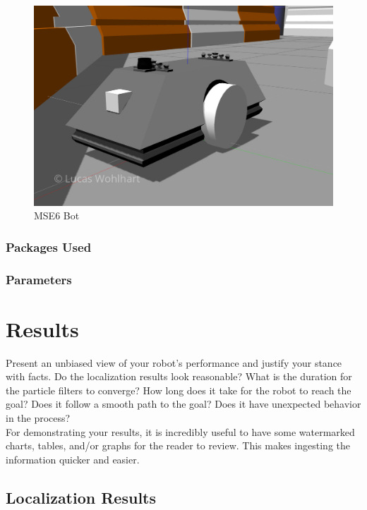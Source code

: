 \documentclass[10pt,journal,compsoc]{IEEEtran}
\begin{document}
\begin{figure}[thpb]
      \centering
      \includegraphics[width=\linewidth]{img/lw_mse6_bot}
      \caption{MSE6 Bot}
      \label{fig:mse6_bot}
\end{figure}
\subsubsection{Packages Used}
\subsubsection{Parameters}


\section{Results}

Present an unbiased view of your robot's performance and justify your stance with facts. Do the localization results look reasonable? What is the duration for the particle filters to converge? How long does it take for the robot to reach the goal? Does it follow a smooth path to the goal? Does it have unexpected behavior in the process? \\
For demonstrating your results, it is incredibly useful to have some watermarked charts, tables, and/or graphs for the reader to review. This makes ingesting the information quicker and easier.

\subsection{Localization Results}
\end{document}
